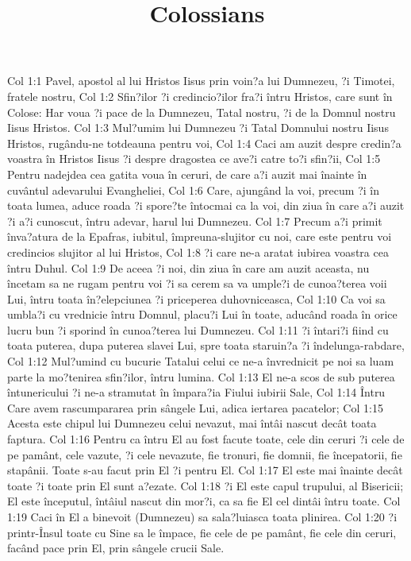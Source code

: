 

\title{Colossians}

Col 1:1  Pavel, apostol al lui Hristos Iisus prin voin?a lui Dumnezeu, ?i Timotei, fratele nostru,
Col 1:2  Sfin?ilor ?i credincio?ilor fra?i întru Hristos, care sunt în Colose: Har voua ?i pace de la Dumnezeu, Tatal nostru, ?i de la Domnul nostru Iisus Hristos.
Col 1:3  Mul?umim lui Dumnezeu ?i Tatal Domnului nostru Iisus Hristos, rugându-ne totdeauna pentru voi,
Col 1:4  Caci am auzit despre credin?a voastra în Hristos Iisus ?i despre dragostea ce ave?i catre to?i sfin?ii,
Col 1:5  Pentru nadejdea cea gatita voua în ceruri, de care a?i auzit mai înainte în cuvântul adevarului Evangheliei,
Col 1:6  Care, ajungând la voi, precum ?i în toata lumea, aduce roada ?i spore?te întocmai ca la voi, din ziua în care a?i auzit ?i a?i cunoscut, întru adevar, harul lui Dumnezeu.
Col 1:7  Precum a?i primit înva?atura de la Epafras, iubitul, împreuna-slujitor cu noi, care este pentru voi credincios slujitor al lui Hristos,
Col 1:8  ?i care ne-a aratat iubirea voastra cea întru Duhul.
Col 1:9  De aceea ?i noi, din ziua în care am auzit aceasta, nu încetam sa ne rugam pentru voi ?i sa cerem sa va umple?i de cunoa?terea voii Lui, întru toata în?elepciunea ?i priceperea duhovniceasca,
Col 1:10  Ca voi sa umbla?i cu vrednicie întru Domnul, placu?i Lui în toate, aducând roada în orice lucru bun ?i sporind în cunoa?terea lui Dumnezeu.
Col 1:11  ?i întari?i fiind cu toata puterea, dupa puterea slavei Lui, spre toata staruin?a ?i îndelunga-rabdare,
Col 1:12  Mul?umind cu bucurie Tatalui celui ce ne-a învrednicit pe noi sa luam parte la mo?tenirea sfin?ilor, întru lumina.
Col 1:13  El ne-a scos de sub puterea întunericului ?i ne-a stramutat în împara?ia Fiului iubirii Sale,
Col 1:14  Întru Care avem rascumpararea prin sângele Lui, adica iertarea pacatelor;
Col 1:15  Acesta este chipul lui Dumnezeu celui nevazut, mai întâi nascut decât toata faptura.
Col 1:16  Pentru ca întru El au fost facute toate, cele din ceruri ?i cele de pe pamânt, cele vazute, ?i cele nevazute, fie tronuri, fie domnii, fie începatorii, fie stapânii. Toate s-au facut prin El ?i pentru El.
Col 1:17  El este mai înainte decât toate ?i toate prin El sunt a?ezate.
Col 1:18  ?i El este capul trupului, al Bisericii; El este începutul, întâiul nascut din mor?i, ca sa fie El cel dintâi întru toate.
Col 1:19  Caci în El a binevoit (Dumnezeu) sa sala?luiasca toata plinirea.
Col 1:20  ?i printr-Însul toate cu Sine sa le împace, fie cele de pe pamânt, fie cele din ceruri, facând pace prin El, prin sângele crucii Sale.
